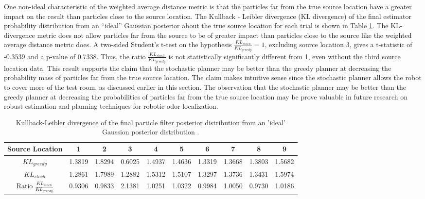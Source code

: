 \documentclass[submit, 12pt]{aiaa-pretty-modified}
\begin{document}
One non-ideal characteristic of the weighted average distance metric
is that the particles far from the true source location have a greater
impact on the result than particles close to the source location.
The Kullback - Leibler divergence (KL divergence) of the final estimator
probability distribution from an ``ideal'' Gaussian posterior about
the true source location for each trial is shown in Table
\ref{tab:kl-ideal}.  The KL-divergence metric does not allow particles far from
the source to be of greater impact than particles close to the source
like the weighted average distance metric does.  A
two-sided Student's t-test on the hypothesis
$\frac{KL_{stoch}}{KL_{greedy}} = 1$, excluding source location 3, gives a t-statistic of -0.3539 and
a p-value of 0.7338.  Thus, the ratio $\frac{KL_{stoch}}{KL_{greedy}}$
is not statistically significantly different from 1, even without the
third source location data.  This result supports the claim that the
stochastic planner may be better than the greedy planner at decreasing the probability mass of
particles far from the true source location.  The claim makes
intuitive sense since the stochastic planner allows the robot to cover
more of the test room, as discussed earlier in this section.  The
observation that the stochastic planner may be better than the greedy
planner at decreasing the probabilities of particles far from the true
source location may be prove valuable in future research on robust
estimation and planning techniques for robotic odor localization.


\begin{table}[htb]
\begin{center}
\begin{tabular}{|c||c||c||c||c||c||c||c||c||c|}
\hline
 Source Location & 1 & 2 & 3 & 4 & 5 & 6 & 7 & 8 & 9 \\
\hline \hline
$KL_{greedy}$ & 1.3819 & 1.8294 & 0.6025 & 1.4937 & 1.4636 & 1.3319 & 1.3668 & 1.3803 & 1.5682 \\
\hline
$KL_{stoch}$  & 1.2861 & 1.7989 & 1.2882 & 1.5312 & 1.5107 & 1.3297 & 1.3736 & 1.3431 & 1.5974 \\
\hline
Ratio $\frac{KL_{stoch}}{KL_{greedy}}$ & 0.9306 & 0.9833 & 2.1381 & 1.0251 & 1.0322 & 0.9984 & 1.0050 & 0.9730 & 1.0186 \\
\hline
\end{tabular}
\caption{Kullback-Leibler divergence of the final particle filter
  posterior distribution from an 'ideal' Gaussion posterior distribution . }
\label{tab:kl-ideal}
\end{center}
\end{table}
\end{document}

